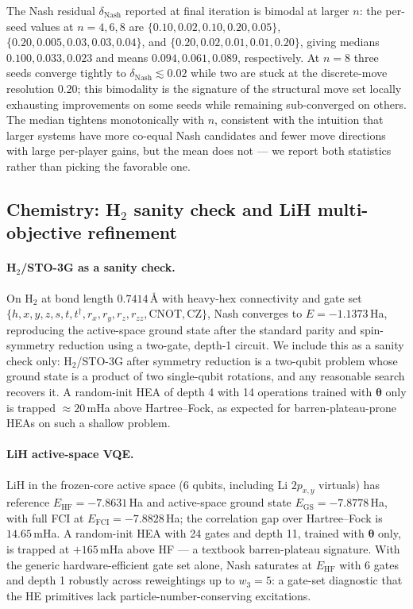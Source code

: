 \documentclass[a4paper,onecolumn,noarxiv]{quantumarticle}
\begin{document}
The Nash residual $\delta_\text{Nash}$ reported at final iteration is bimodal at larger $n$: the per-seed values at $n=4,6,8$ are $\{0.10,0.02,0.10,0.20,0.05\}$, $\{0.20,0.005,0.03,0.03,0.04\}$, and $\{0.20,0.02,0.01,0.01,0.20\}$, giving medians $0.100,0.033,0.023$ and means $0.094,0.061,0.089$, respectively. At $n=8$ three seeds converge tightly to $\delta_\text{Nash}\lesssim 0.02$ while two are stuck at the discrete-move resolution $0.20$; this bimodality is the signature of the structural move set locally exhausting improvements on some seeds while remaining sub-converged on others. The median tightens monotonically with $n$, consistent with the intuition that larger systems have more co-equal Nash candidates and fewer move directions with large per-player gains, but the mean does not — we report both statistics rather than picking the favorable one.

\subsection{Chemistry: \texorpdfstring{H$_2$}{H2} sanity check and LiH multi-objective refinement}
\label{sec:chem}

\paragraph*{H$_2$/STO-3G as a sanity check.}
On H$_2$ at bond length $0.7414$\,\AA{} with heavy-hex connectivity and gate set $\{h,x,y,z,s,t,t^\dagger,r_x,r_y,r_z,r_{zz},\text{CNOT},\text{CZ}\}$, Nash converges to $E=-1.1373$\,Ha, reproducing the active-space ground state after the standard parity and spin-symmetry reduction using a two-gate, depth-1 circuit. We include this as a sanity check only: H$_2$/STO-3G after symmetry reduction is a two-qubit problem whose ground state is a product of two single-qubit rotations, and any reasonable search recovers it. A random-init HEA of depth 4 with 14 operations trained with $\bm\theta$ only is trapped $\approx 20$\,mHa above Hartree--Fock, as expected for barren-plateau-prone HEAs on such a shallow problem.

\paragraph*{LiH active-space VQE.}
LiH in the frozen-core active space (6 qubits, including Li $2p_{x,y}$ virtuals) has reference $E_\text{HF}=-7.8631$\,Ha and active-space ground state $E_\text{GS}=-7.8778$\,Ha, with full FCI at $E_\text{FCI}=-7.8828$\,Ha; the correlation gap over Hartree--Fock is $14.65$\,mHa. A random-init HEA with 24 gates and depth 11, trained with $\bm\theta$ only, is trapped at $+165$\,mHa above HF — a textbook barren-plateau signature. With the generic hardware-efficient gate set alone, Nash saturates at $E_\text{HF}$ with 6 gates and depth 1 robustly across reweightings up to $w_3=5$: a gate-set diagnostic that the HE primitives lack particle-number-conserving excitations.
\end{document}
